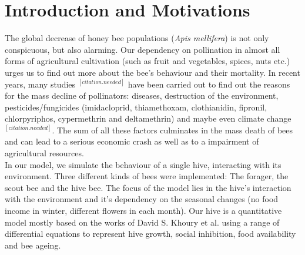 \section{Introduction and Motivations}
The global decrease of honey bee populations (\textit{Apis mellifera}) is not only conspicuous, but also alarming. Our dependency on pollination in almost all forms of agricultural cultivation (such as fruit and vegetables, spices, nuts etc.) urges us to find out more about the bee's behaviour and their mortality. In recent years, many studies $^{[citation.needed]}$ have been carried out to find out the reasons for the mass decline of pollinators: diseases, destruction of the environment, pesticides/fungicides (imidacloprid, thiamethoxam, clothianidin, fipronil, chlorpyriphos, cypermethrin and deltamethrin) and maybe even climate change $^{[citation.needed]}$. The sum of all these factors culminates in the mass death of bees and can lead to a serious economic crash as well as to a impairment of agricultural resources.\\
In our model, we simulate the behaviour of a single hive, interacting with its environment. Three different kinds of bees were implemented: The forager, the scout bee and the hive bee. The focus of the model lies in the hive's interaction with the environment and it's dependency on the seasonal changes (no food income in winter, different flowers in each month). Our hive is a quantitative model mostly based on the works of David S. Khoury et al. \cite{khoury13} using a range of differential equations to represent hive growth, social inhibition, food availability and bee ageing.  